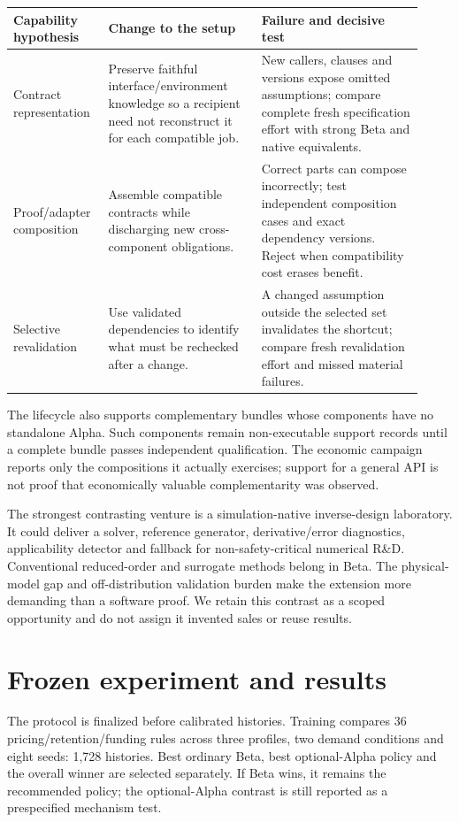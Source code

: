 \documentclass[11pt,letterpaper]{article}
\begin{document}
\begin{longtable}{L{0.20\linewidth}L{0.35\linewidth}L{0.37\linewidth}}
\toprule Capability hypothesis & Change to the setup & Failure and decisive test \\
\midrule\endhead
Contract representation & Preserve faithful interface/environment knowledge so a recipient need not reconstruct it for each compatible job. & New callers, clauses and versions expose omitted assumptions; compare complete fresh specification effort with strong Beta and native equivalents. \\
Proof/adapter composition & Assemble compatible contracts while discharging new cross-component obligations. & Correct parts can compose incorrectly; test independent composition cases and exact dependency versions. Reject when compatibility cost erases benefit. \\
Selective revalidation & Use validated dependencies to identify what must be rechecked after a change. & A changed assumption outside the selected set invalidates the shortcut; compare fresh revalidation effort and missed material failures. \\
\bottomrule
\end{longtable}

The lifecycle also supports complementary bundles whose components have no standalone Alpha. Such components remain non-executable support records until a complete bundle passes independent qualification. The economic campaign reports only the compositions it actually exercises; support for a general API is not proof that economically valuable complementarity was observed.

The strongest contrasting venture is a simulation-native inverse-design laboratory. It could deliver a solver, reference generator, derivative/error diagnostics, applicability detector and fallback for non-safety-critical numerical R\&D. Conventional reduced-order and surrogate methods belong in Beta. The physical-model gap and off-distribution validation burden make the extension more demanding than a software proof. We retain this contrast as a scoped opportunity and do not assign it invented sales or reuse results.

\section{Frozen experiment and results}

The protocol is finalized before calibrated histories. Training compares 36 pricing/retention/funding rules across three profiles, two demand conditions and eight seeds: 1,728 histories. Best ordinary Beta, best optional-Alpha policy and the overall winner are selected separately. If Beta wins, it remains the recommended policy; the optional-Alpha contrast is still reported as a prespecified mechanism test.
\end{document}
